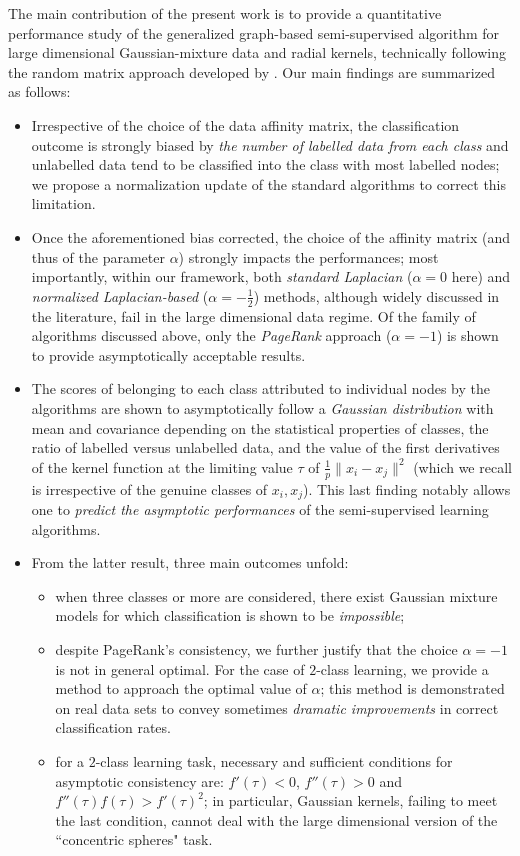 \documentclass[twoside,11pt]{article}
\begin{document}
The main contribution of the present work is to provide a quantitative performance study of the generalized graph-based semi-supervised algorithm for large dimensional Gaussian-mixture data and radial kernels, technically following the random matrix approach developed by \citet{couillet2015kernel}. Our main findings are summarized as follows:
\begin{itemize}
\item Irrespective of the choice of the data affinity matrix, the classification outcome is strongly biased by \textit{the number of labelled data from each class} and unlabelled data tend to be classified into the class with most labelled nodes; we propose a normalization update of the standard algorithms to correct this limitation.
\item Once the aforementioned bias corrected, the choice of the affinity matrix (and thus of the parameter $\alpha$) strongly impacts the performances; most importantly, within our framework, both \textit{standard Laplacian} ($\alpha=0$ here) and \textit{normalized Laplacian-based} ($\alpha=-\frac12$) methods, although widely discussed in the literature, fail in the large dimensional data regime. Of the family of algorithms discussed above, only the \textit{PageRank} approach ($\alpha=-1$) is shown to provide asymptotically acceptable results. 
\item The scores of belonging to each class attributed to individual nodes by the algorithms are shown to asymptotically follow a \textit{Gaussian distribution} with mean and covariance depending on the statistical properties of classes, the ratio of labelled versus unlabelled data, and the value of the first derivatives of the kernel function at the limiting value $\tau$ of $\frac1p\|x_{i}-x_{j}\|^{2}$ (which we recall is irrespective of the genuine classes of $x_i,x_j$). This last finding notably allows one to \textit{predict the asymptotic performances} of the semi-supervised learning algorithms.
\item From the latter result, three main outcomes unfold:
	\begin{itemize}
		\item when three classes or more are considered, there exist Gaussian mixture models for which classification is shown to be \textit{impossible};
		\item despite PageRank's consistency, we further justify that the choice $\alpha=-1$ is not in general optimal. For the case of $2$-class learning, we provide a method to approach the optimal value of $\alpha$; this method is demonstrated on real data sets to convey sometimes \textit{dramatic improvements} in correct classification rates.
		\item for a $2$-class learning task, necessary and sufficient conditions for asymptotic consistency are: $f'(\tau)<0$, $f''(\tau)>0$ and $f''(\tau)f(\tau)>f'(\tau)^2$; in particular, Gaussian kernels, failing to meet the last condition, cannot deal with the large dimensional version of the ``concentric spheres" task.
	\end{itemize}
\end{itemize}
\end{document}
